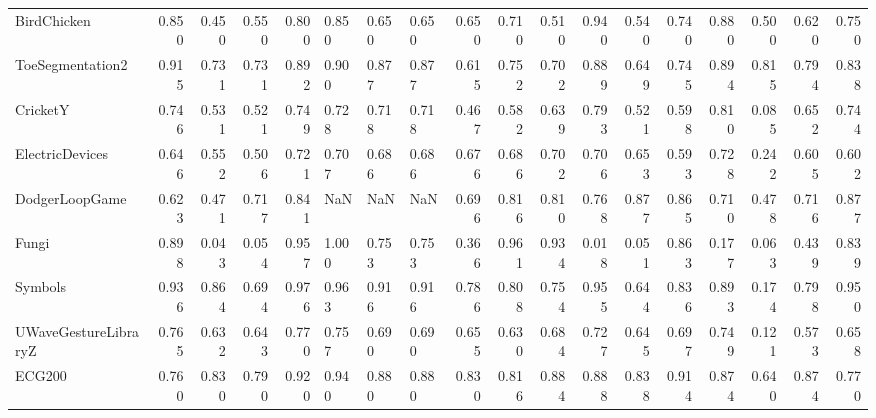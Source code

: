 \begin{tabular}{lrrrrlllrrrrrrrrrr}
BirdChicken & 0.850 & 0.450 & 0.550 & 0.800 & 0.850 & 0.650 & 0.650 & 0.650 & 0.710 & 0.510 & 0.940 & 0.540 & 0.740 & 0.880 & 0.500 & 0.620 & 0.750 \\
ToeSegmentation2 & 0.915 & 0.731 & 0.731 & 0.892 & 0.900 & 0.877 & 0.877 & 0.615 & 0.752 & 0.702 & 0.889 & 0.649 & 0.745 & 0.894 & 0.815 & 0.794 & 0.838 \\
CricketY & 0.746 & 0.531 & 0.521 & 0.749 & 0.728 & 0.718 & 0.718 & 0.467 & 0.582 & 0.639 & 0.793 & 0.521 & 0.598 & 0.810 & 0.085 & 0.652 & 0.744 \\
ElectricDevices & 0.646 & 0.552 & 0.506 & 0.721 & 0.707 & 0.686 & 0.686 & 0.676 & 0.686 & 0.702 & 0.706 & 0.653 & 0.593 & 0.728 & 0.242 & 0.605 & 0.602 \\
DodgerLoopGame & 0.623 & 0.471 & 0.717 & 0.841 & NaN & NaN & NaN & 0.696 & 0.816 & 0.810 & 0.768 & 0.877 & 0.865 & 0.710 & 0.478 & 0.716 & 0.877 \\
Fungi & 0.898 & 0.043 & 0.054 & 0.957 & 1.000 & 0.753 & 0.753 & 0.366 & 0.961 & 0.934 & 0.018 & 0.051 & 0.863 & 0.177 & 0.063 & 0.439 & 0.839 \\
Symbols & 0.936 & 0.864 & 0.694 & 0.976 & 0.963 & 0.916 & 0.916 & 0.786 & 0.808 & 0.754 & 0.955 & 0.644 & 0.836 & 0.893 & 0.174 & 0.798 & 0.950 \\
UWaveGestureLibraryZ & 0.765 & 0.632 & 0.643 & 0.770 & 0.757 & 0.690 & 0.690 & 0.655 & 0.630 & 0.684 & 0.727 & 0.645 & 0.697 & 0.749 & 0.121 & 0.573 & 0.658 \\
ECG200 & 0.760 & 0.830 & 0.790 & 0.920 & 0.940 & 0.880 & 0.880 & 0.830 & 0.816 & 0.884 & 0.888 & 0.838 & 0.914 & 0.874 & 0.640 & 0.874 & 0.770 \\
\bottomrule
\end{tabular}
